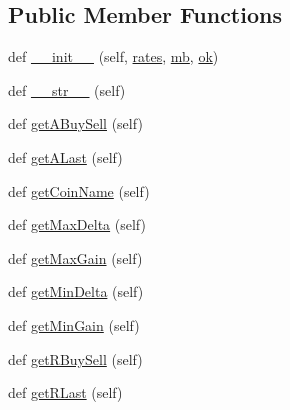\subsection*{Public Member Functions}
\begin{DoxyCompactItemize}
\item 
def \hyperlink{classexch2exch_1_1_differences_a8fd6c2cfe882605393c297053b73326e}{\+\_\+\+\_\+init\+\_\+\+\_\+} (self, \hyperlink{classexch2exch_1_1_differences_a64aec2fc7f20028f0bd834908cbea116}{rates}, \hyperlink{classexch2exch_1_1_differences_a81c81e9c15b5ea8a5d39bb99d85250e1}{mb}, \hyperlink{classexch2exch_1_1_differences_a6de3ee563584c83a97ba815db8ec7831}{ok})
\item 
def \hyperlink{classexch2exch_1_1_differences_af2d3dc1abc5bfb7f84192e03af199c5f}{\+\_\+\+\_\+str\+\_\+\+\_\+} (self)
\item 
def \hyperlink{classexch2exch_1_1_differences_a5b1000fb221e0726fb36a8e9a0655d84}{get\+A\+Buy\+Sell} (self)
\item 
def \hyperlink{classexch2exch_1_1_differences_ae65d1f91ffad5d587a564d7160263b83}{get\+A\+Last} (self)
\item 
def \hyperlink{classexch2exch_1_1_differences_a27c3904cedfe6f58d750591c1f7c7879}{get\+Coin\+Name} (self)
\item 
def \hyperlink{classexch2exch_1_1_differences_a577c9c2cbc470643f7bff8fc50295816}{get\+Max\+Delta} (self)
\item 
def \hyperlink{classexch2exch_1_1_differences_a3b557469ba68c3041d6ef04dc847c77b}{get\+Max\+Gain} (self)
\item 
def \hyperlink{classexch2exch_1_1_differences_ad2c60e37e0a390dd89be5d9388e552a4}{get\+Min\+Delta} (self)
\item 
def \hyperlink{classexch2exch_1_1_differences_a110cb3a79f744b6d3911b6669b8a0a89}{get\+Min\+Gain} (self)
\item 
def \hyperlink{classexch2exch_1_1_differences_ae360dc9692075e21d0aafa2ff1dc23d4}{get\+R\+Buy\+Sell} (self)
\item 
def \hyperlink{classexch2exch_1_1_differences_ac4f1f695ff394d65cfb51ea55dc67fa5}{get\+R\+Last} (self)
\end{DoxyCompactItemize}
